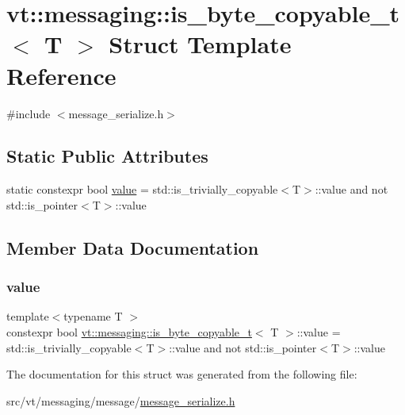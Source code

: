 \hypertarget{structvt_1_1messaging_1_1is__byte__copyable__t}{}\section{vt\+:\+:messaging\+:\+:is\+\_\+byte\+\_\+copyable\+\_\+t$<$ T $>$ Struct Template Reference}
\label{structvt_1_1messaging_1_1is__byte__copyable__t}


{\ttfamily \#include $<$message\+\_\+serialize.\+h$>$}

\subsection*{Static Public Attributes}
\begin{DoxyCompactItemize}
\item 
static constexpr bool \hyperlink{structvt_1_1messaging_1_1is__byte__copyable__t_ab69321190f297b7962efa8a8b0543c35}{value} = std\+::is\+\_\+trivially\+\_\+copyable$<$T$>$\+::value and not std\+::is\+\_\+pointer$<$T$>$\+::value
\end{DoxyCompactItemize}


\subsection{Member Data Documentation}
\mbox{\label{structvt_1_1messaging_1_1is__byte__copyable__t_ab69321190f297b7962efa8a8b0543c35}} 
\subsubsection{\texorpdfstring{value}{value}}
{\footnotesize\ttfamily template$<$typename T $>$ \\
constexpr bool \hyperlink{structvt_1_1messaging_1_1is__byte__copyable__t}{vt\+::messaging\+::is\+\_\+byte\+\_\+copyable\+\_\+t}$<$ T $>$\+::value = std\+::is\+\_\+trivially\+\_\+copyable$<$T$>$\+::value and not std\+::is\+\_\+pointer$<$T$>$\+::value\hspace{0.3cm}{\ttfamily [static]}}



The documentation for this struct was generated from the following file\+:\begin{DoxyCompactItemize}
\item 
src/vt/messaging/message/\hyperlink{message__serialize_8h}{message\+\_\+serialize.\+h}\end{DoxyCompactItemize}
